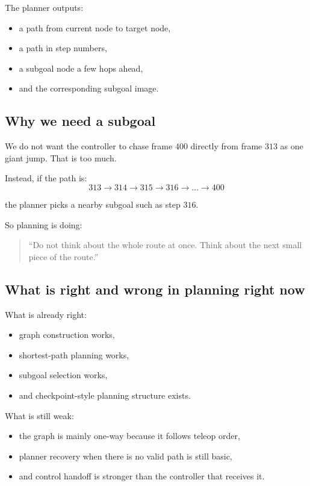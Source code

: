 \documentclass[11pt,a4paper]{article}
\begin{document}
The planner outputs:

\begin{itemize}[nosep]
  \item a path from current node to target node,
  \item a path in step numbers,
  \item a subgoal node a few hops ahead,
  \item and the corresponding subgoal image.
\end{itemize}

\subsection{Why we need a subgoal}

We do not want the controller to chase frame $400$ directly from frame $313$ as
one giant jump.  That is too much.

Instead, if the path is:
\[
313 \rightarrow 314 \rightarrow 315 \rightarrow 316 \rightarrow \dots \rightarrow 400
\]

the planner picks a nearby subgoal such as step $316$.

So planning is doing:

\begin{quote}
``Do not think about the whole route at once.  Think about the next small piece
of the route.''
\end{quote}

\subsection{What is right and wrong in planning right now}

What is already right:

\begin{itemize}[nosep]
  \item graph construction works,
  \item shortest-path planning works,
  \item subgoal selection works,
  \item and checkpoint-style planning structure exists.
\end{itemize}

What is still weak:

\begin{itemize}[nosep]
  \item the graph is mainly one-way because it follows teleop order,
  \item planner recovery when there is no valid path is still basic,
  \item and control handoff is stronger than the controller that receives it.
\end{itemize}
\end{document}
